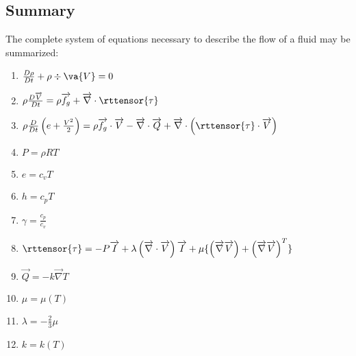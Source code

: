 \subsection{Summary}

The complete system of equations necessary to describe the flow of a fluid may
be summarized:

\begin{enumerate}
  \item{$
    \frac{D\rho}{Dt} 
    + \rho \div{\va{V}} = 0
  $}
  \item{$
    \rho\frac{D\overrightarrow{V}}{Dt} = 
    \rho\overrightarrow{f_g} 
    + \overrightarrow{\nabla}\cdot\rttensor{\tau} 
  $}
  \item{$
    \rho\frac{D}{Dt}\left(e + \frac{V^2}{2}\right) =
    \rho \overrightarrow{f_g}\cdot\overrightarrow{V}
    - \overrightarrow{\nabla}\cdot\overrightarrow{Q}
    + \overrightarrow{\nabla}\cdot\left(\rttensor{\tau}\cdot\overrightarrow{V}\right)
  $}
  \item{$P = \rho R T $}
  \item{$e = c_v T $}
  \item{$h = c_p T $}
  \item{$ \gamma = \frac{c_p}{c_v} $}
  \item{$
    \rttensor{\tau} = 
    - P\overrightarrow{I} 
    + \lambda\left(\overrightarrow{\nabla}\cdot\overrightarrow{V}\right)\overrightarrow{I}
    + \mu\{\left(\overrightarrow{\nabla}\overrightarrow{V}\right) 
    + \left(\overrightarrow{\nabla}\overrightarrow{V}\right)^T\}
  $}
  \item{$ \overrightarrow{Q} = -k \overrightarrow{\nabla}T $}
  \item{$ \mu = \mu(T) $}
  \item{$\lambda = -\frac{2}{3}\mu $}
  \item{$k = k(T) $}
\end{enumerate}


